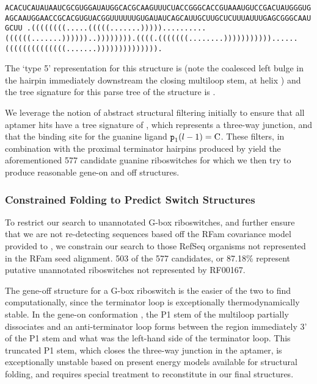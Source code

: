 \begin{center} \label{}
  \small\tt ACACUCAUAUAAUCGCGUGGAUAUGGCACGCAAGUUUCUACCGGGCACCGUAAAUGUCCGACUAUGGGUGAGCAAUGGAACCGCACGUGUACGGUUUUUUGUGAUAUCAGCAUUGCUUGCUCUUUAUUUGAGCGGGCAAUGCUU
  \small\tt .((((((((.....(((((.......)))))..........((((((.......))))))..)))))))).((((.(((((((........)))))))))))......((((((((((((((.......)))))))))))))).
\end{center}

The \rshapes `type 5' representation for this structure is \ms{[[][]][][]} (note the coalesced left bulge in the hairpin immediately downstream the closing multiloop stem, at helix ) and the tree signature for this parse tree of the structure is \ms{[0, 1, 2, 2, 1, 1]}.

We leverage the notion of abstract structural filtering initially to ensure that all \infernal aptamer hits have a tree signature of \ms{[0, 1, 2, 2]}, which represents a three-way junction, and that the binding site for the guanine ligand ${\text{\mbox{\tt p}}}_{\text{1}}(l - 1) = \text{C}$. These filters, in combination with the proximal terminator hairpins produced by \tthp yield the aforementioned 577 candidate guanine riboswitches for which we then try to produce reasonable gene-on and off structures.

\subsubsection{Constrained Folding to Predict Switch Structures}
\label{subsubsec:rfinder:consfold}

To restrict our search to unannotated G-box riboswitches, and further ensure that we are not re-detecting sequences based off the RFam covariance model provided to \infernal, we constrain our search to those RefSeq organisms not represented in the RFam seed alignment. 503 of the 577 candidates, or 87.18\% represent putative unannotated riboswitches not represented by RF00167.

The gene-off structure \strOff for a G-box riboswitch is the easier of the two to find computationally, since the terminator loop is exceptionally thermodynamically stable. In the gene-on conformation \strOn, the P1 stem of the multiloop partially dissociates and an anti-terminator loop forms between the region immediately 3' of the P1 stem and what was the left-hand side of the terminator loop. This truncated P1 stem, which closes the three-way junction in the aptamer, is exceptionally unstable based on present energy models available for structural folding, and requires special treatment to reconstitute in our final structures.

